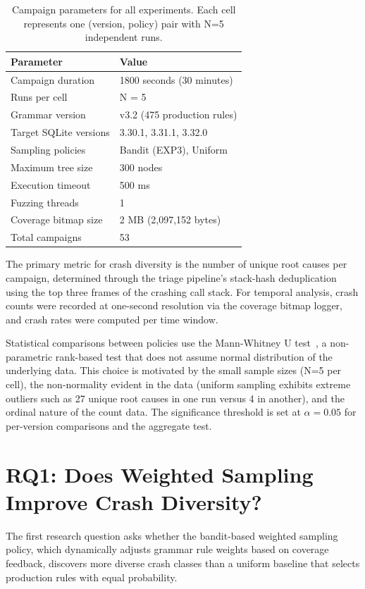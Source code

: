 \begin{table}[htbp]
\caption{Campaign parameters for all experiments. Each cell represents one (version, policy) pair with N=5 independent runs.}
\label{tab:params}
\centering
\begin{tabular}{ll}
\toprule
\textbf{Parameter} & \textbf{Value} \\
\midrule
Campaign duration & 1800 seconds (30 minutes) \\
Runs per cell & N = 5 \\
Grammar version & v3.2 (475 production rules) \\
Target SQLite versions & 3.30.1, 3.31.1, 3.32.0 \\
Sampling policies & Bandit (EXP3), Uniform \\
Maximum tree size & 300 nodes \\
Execution timeout & 500 ms \\
Fuzzing threads & 1 \\
Coverage bitmap size & 2 MB (2,097,152 bytes) \\
Total campaigns & 53 \\
\bottomrule
\end{tabular}
\end{table}

The primary metric for crash diversity is the number of unique root causes per campaign, determined through the triage pipeline's stack-hash deduplication using the top three frames of the crashing call stack. For temporal analysis, crash counts were recorded at one-second resolution via the coverage bitmap logger, and crash rates were computed per time window.

Statistical comparisons between policies use the Mann-Whitney U test~\cite{mannwhitney}, a non-parametric rank-based test that does not assume normal distribution of the underlying data. This choice is motivated by the small sample sizes (N=5 per cell), the non-normality evident in the data (uniform sampling exhibits extreme outliers such as 27 unique root causes in one run versus 4 in another), and the ordinal nature of the count data. The significance threshold is set at $\alpha = 0.05$ for per-version comparisons and the aggregate test.


\section{RQ1: Does Weighted Sampling Improve Crash Diversity?}
\label{sec:rq1}

The first research question asks whether the bandit-based weighted sampling policy, which dynamically adjusts grammar rule weights based on coverage feedback, discovers more diverse crash classes than a uniform baseline that selects production rules with equal probability.

